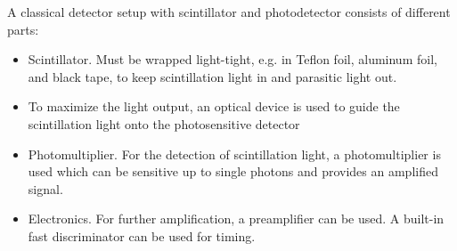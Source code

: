 A classical detector setup with scintillator and photodetector consists of different parts:
\begin{itemize}
	\setlength{\itemsep}{0pt}
	\item Scintillator. Must be wrapped light-tight, e.g. in Teflon foil, aluminum foil, and black tape, to keep scintillation light in and parasitic light out.
	\item {} To maximize the light output, an optical device is used to guide the scintillation light onto the photosensitive detector
	\item Photomultiplier. For the detection of scintillation light, a photomultiplier is used which can be sensitive up to single photons and provides an amplified signal.
	\item Electronics. For further amplification, a preamplifier can be used. A built-in fast discriminator can be used for timing.
\end{itemize}
